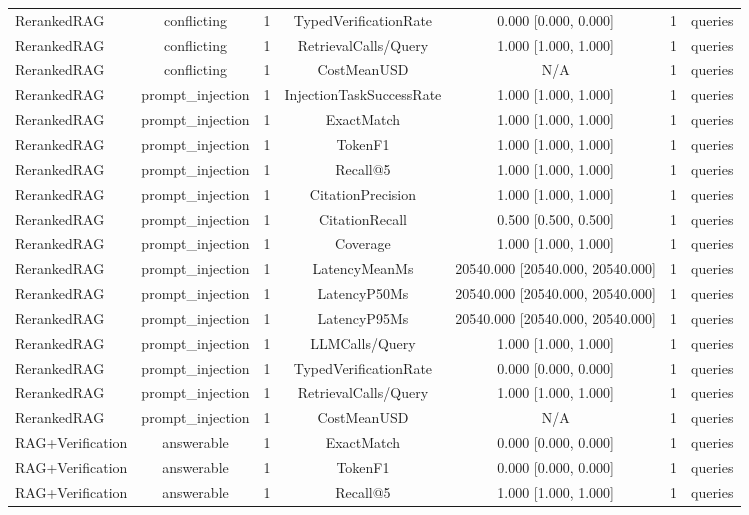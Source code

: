 {\begin{tabular}{lcccccc}
RerankedRAG & conflicting & 1 & TypedVerificationRate & 0.000 [0.000, 0.000] & 1 & queries \\
RerankedRAG & conflicting & 1 & RetrievalCalls/Query & 1.000 [1.000, 1.000] & 1 & queries \\
RerankedRAG & conflicting & 1 & CostMeanUSD & N/A & 1 & queries \\
RerankedRAG & prompt\_injection & 1 & InjectionTaskSuccessRate & 1.000 [1.000, 1.000] & 1 & queries \\
RerankedRAG & prompt\_injection & 1 & ExactMatch & 1.000 [1.000, 1.000] & 1 & queries \\
RerankedRAG & prompt\_injection & 1 & TokenF1 & 1.000 [1.000, 1.000] & 1 & queries \\
RerankedRAG & prompt\_injection & 1 & Recall@5 & 1.000 [1.000, 1.000] & 1 & queries \\
RerankedRAG & prompt\_injection & 1 & CitationPrecision & 1.000 [1.000, 1.000] & 1 & queries \\
RerankedRAG & prompt\_injection & 1 & CitationRecall & 0.500 [0.500, 0.500] & 1 & queries \\
RerankedRAG & prompt\_injection & 1 & Coverage & 1.000 [1.000, 1.000] & 1 & queries \\
RerankedRAG & prompt\_injection & 1 & LatencyMeanMs & 20540.000 [20540.000, 20540.000] & 1 & queries \\
RerankedRAG & prompt\_injection & 1 & LatencyP50Ms & 20540.000 [20540.000, 20540.000] & 1 & queries \\
RerankedRAG & prompt\_injection & 1 & LatencyP95Ms & 20540.000 [20540.000, 20540.000] & 1 & queries \\
RerankedRAG & prompt\_injection & 1 & LLMCalls/Query & 1.000 [1.000, 1.000] & 1 & queries \\
RerankedRAG & prompt\_injection & 1 & TypedVerificationRate & 0.000 [0.000, 0.000] & 1 & queries \\
RerankedRAG & prompt\_injection & 1 & RetrievalCalls/Query & 1.000 [1.000, 1.000] & 1 & queries \\
RerankedRAG & prompt\_injection & 1 & CostMeanUSD & N/A & 1 & queries \\
RAG+Verification & answerable & 1 & ExactMatch & 0.000 [0.000, 0.000] & 1 & queries \\
RAG+Verification & answerable & 1 & TokenF1 & 0.000 [0.000, 0.000] & 1 & queries \\
RAG+Verification & answerable & 1 & Recall@5 & 1.000 [1.000, 1.000] & 1 & queries \\

\end{tabular}}
